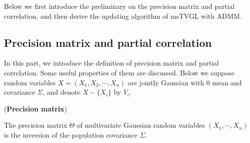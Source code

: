 
Below we first introduce the preliminary on the precision matrix and partial correlation, 
and then derive the updating algorithm of msTVGL with ADMM.

\subsection{Precision matrix and partial correlation}
\label{subsec: pcorrandprec}
In this part, we introduce the definition of precision matrix and partial correlation. 
Some useful properties of them are discussed. 
Below we suppose random variables $X=(X_1,X_2,\cdots,X_n)$ are jointly Gaussian with 0 mean and covariance $\Sigma$,  
and denote $X-\{X_i\}$ by $V_i$. 

\begin{definition}(\textbf{Precision matrix})

    The precision matrix $\Theta$ of multivariate Gaussian random variables $(X_1,\cdots,X_n)$ is the inversion of the population covariance $\Sigma$.
\end{definition}

